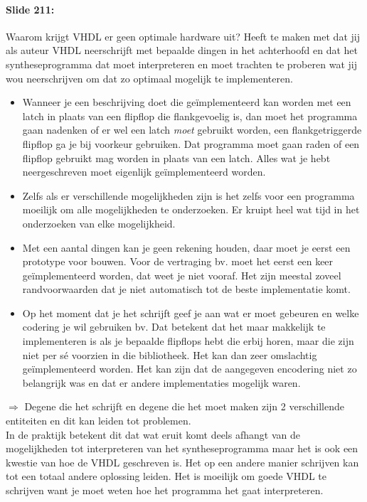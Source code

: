 \documentclass[10pt,a4paper]{book}
\begin{document}
\paragraph{Slide 211:} Waarom krijgt VHDL er geen optimale hardware uit? Heeft te maken met dat jij als auteur VHDL neerschrijft met bepaalde dingen in het achterhoofd en dat het syntheseprogramma dat moet interpreteren en moet trachten te proberen wat jij wou neerschrijven om dat zo optimaal mogelijk te implementeren.
\begin{itemize}
\item Wanneer je een beschrijving doet die ge\"implementeerd kan worden met een latch in plaats van een flipflop die flankgevoelig is, dan moet het programma gaan nadenken of er wel een latch \emph{moet} gebruikt worden, een flankgetriggerde flipflop ga je bij voorkeur gebruiken. Dat programma moet gaan raden of een flipflop gebruikt mag worden in plaats van een latch. Alles wat je hebt neergeschreven moet eigenlijk ge\"implementeerd worden. 
\item Zelfs als er verschillende mogelijkheden zijn is het zelfs voor een programma moeilijk om alle mogelijkheden te onderzoeken. Er kruipt heel wat tijd in het onderzoeken van elke mogelijkheid.
\item Met een aantal dingen kan je geen rekening houden, daar moet je eerst een prototype voor bouwen. Voor de vertraging bv. moet het eerst een keer ge\"implementeerd worden, dat weet je niet vooraf. Het zijn meestal zoveel randvoorwaarden dat je niet automatisch tot de beste implementatie komt.
\item Op het moment dat je het schrijft geef je aan wat er moet gebeuren en welke codering je wil gebruiken bv. Dat betekent dat het maar makkelijk te implementeren is als je bepaalde flipflops hebt die erbij horen, maar die zijn niet per s\'e voorzien in die bibliotheek. Het kan dan zeer omslachtig ge\"implementeerd worden. Het kan zijn dat de aangegeven encodering niet zo belangrijk was en dat er andere implementaties mogelijk waren.
\end{itemize}	
$\Rightarrow$ Degene die het schrijft en degene die het moet maken zijn 2 verschillende entiteiten en dit kan leiden tot problemen.\\
In de praktijk betekent dit dat wat eruit komt deels afhangt van de mogelijkheden tot interpreteren van het syntheseprogramma maar het is ook een kwestie van hoe de VHDL geschreven is. Het op een andere manier schrijven kan tot een totaal andere oplossing leiden. Het is moeilijk om goede VHDL te schrijven want je moet weten hoe het programma het gaat interpreteren.
\end{document}
